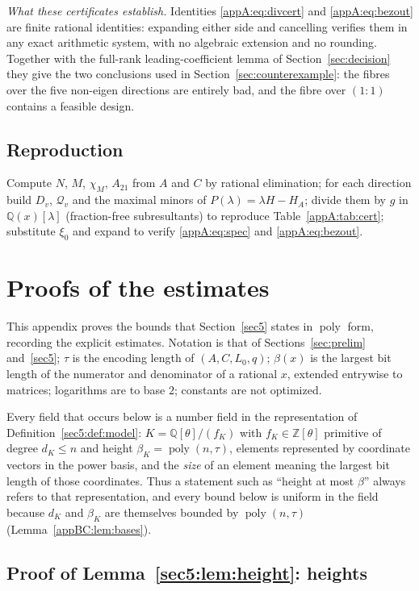 \documentclass[journal]{IEEEtran}
\theoremstyle{plainn}
\theoremstyle{remark}
\newcommand{\poly}{\operatorname{poly}}
\begin{document}
\emph{What these certificates establish.} Identities \eqref{appA:eq:divcert} and
\eqref{appA:eq:bezout} are finite rational identities: expanding either side and cancelling verifies
them in any exact arithmetic system, with no algebraic extension and no rounding. Together with the
full-rank leading-coefficient lemma of Section~\ref{sec:decision} they give the two conclusions used in
Section~\ref{sec:counterexample}: the fibres over the five non-eigen directions are entirely bad, and
the fibre over $(1\!:\!1)$ contains a feasible design.
\subsection{Reproduction}
\label{appA:reproduction}
Compute $N$, $M$, $\chi_M$, $A_{21}$ from $A$ and $C$ by rational elimination; for each direction build
$D_v$, $\mathcal Q_v$ and the maximal minors of $P(\lambda)=\lambda H-H_A$; divide them by $g$ in
$\mathbb Q(x)[\lambda]$ (fraction-free subresultants) to reproduce Table~\ref{appA:tab:cert}; substitute
$\xi_0$ and expand to verify \eqref{appA:eq:spec} and \eqref{appA:eq:bezout}.

\section{Proofs of the estimates}\label{appBC}\label{appB}\label{app:subresultant}

This appendix proves the bounds that Section~\ref{sec5} states in $\poly$ form, recording the explicit
estimates. Notation is that of Sections~\ref{sec:prelim} and~\ref{sec5}; $\tau$ is the encoding length
of $(A,C,L_0,q)$; $\beta(x)$ is the largest bit length of the numerator and denominator of a rational
$x$, extended entrywise to matrices; logarithms are to base $2$; constants are not optimized.

Every field that occurs below is a number field in the representation of
Definition~\ref{sec5:def:model}: $K=\mathbb{Q}[\theta]/(f_K)$ with $f_K\in\mathbb{Z}[\theta]$
primitive of degree $d_K\le n$ and height $\beta_K=\poly(n,\tau)$, elements represented by coordinate
vectors in the power basis, and the \emph{size} of an element meaning the largest bit length of those
coordinates. Thus a statement such as ``height at most $\beta$'' always refers to that representation,
and every bound below is uniform in the field because $d_K$ and $\beta_K$ are themselves bounded by
$\poly(n,\tau)$ (Lemma~\ref{appBC:lem:bases}).

\subsection{Proof of Lemma~\ref{sec5:lem:height}: heights}\label{appBC:sub:norm}
\end{document}

